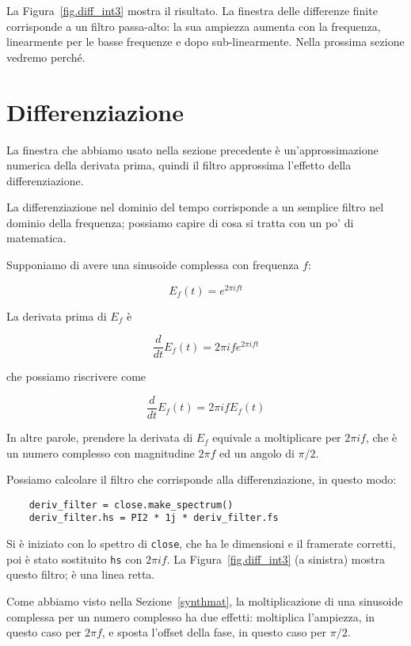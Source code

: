 \documentclass[12pt,a4paper]{book}
\begin{document}
La Figura~\ref{fig.diff_int3} mostra il risultato. La finestra delle differenze finite corrisponde a un filtro passa-alto: la sua ampiezza aumenta con la frequenza, linearmente per le basse frequenze e dopo sub-linearmente. Nella prossima sezione vedremo perché.

\section{Differenziazione} \label{effdiff} 

La finestra che abbiamo usato nella sezione precedente è un'approssimazione numerica della derivata prima, quindi il filtro approssima l'effetto della differenziazione.

La differenziazione nel dominio del tempo corrisponde a un semplice filtro nel dominio della frequenza; possiamo capire di cosa si tratta con un po' di matematica.

Supponiamo di avere una sinusoide complessa con frequenza $f$:

%
\[ E_f(t) = e^{2 \pi i f t} \] 

%
La derivata prima di $E_f$ è

%
\[ \frac{d}{dt} E_f(t) = 2 \pi i f e^{2 \pi i f t} \] 

%
che possiamo riscrivere come

%
\[ \frac{d}{dt} E_f(t) = 2 \pi i f E_f(t) \] 

%
In altre parole, prendere la derivata di $E_f$ equivale a moltiplicare per $2 \pi i f$, che è un numero complesso con magnitudine $2 \pi f$ ed un angolo di $\pi/2$.

Possiamo calcolare il filtro che corrisponde alla differenziazione, in questo modo:

\begin{verbatim} 
    deriv_filter = close.make_spectrum()
    deriv_filter.hs = PI2 * 1j * deriv_filter.fs
 \end{verbatim} 

Si è iniziato con lo spettro di {\tt close}, che ha le dimensioni e il framerate corretti, poi è stato sostituito {\tt hs} con $2 \pi i f$. La Figura~\ref{fig.diff_int3} (a sinistra) mostra questo filtro; è una linea retta.

Come abbiamo visto nella Sezione~\ref{synthmat}, la moltiplicazione di una sinusoide complessa per un numero complesso ha due effetti: moltiplica l'ampiezza, in questo caso per $2 \pi f$, e sposta l'offset della fase, in questo caso per $\pi/2$.
\end{document}
